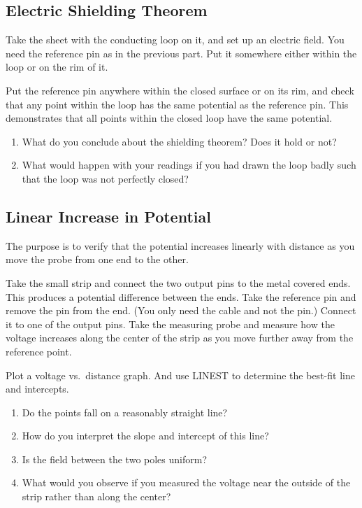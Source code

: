 \subsection{Electric Shielding Theorem}

Take the sheet with the conducting loop on it, and set up an electric field. You need the reference pin as in the previous part. Put it somewhere either within the loop or on the rim of it.\myskip

Put the reference pin anywhere within the closed surface or on its rim, and check that any point within the loop has the same potential as the reference pin. This demonstrates that all points within the closed loop have the same potential.
\begin{enumerate}
    \item What do you conclude about the shielding theorem? Does it hold or not?
    \item What would happen with your readings if you had drawn the loop badly such that the loop was not perfectly closed?
\end{enumerate}

\subsection{Linear Increase in Potential}

The purpose is to verify that the potential increases linearly with distance as you move the probe from one end to the other.\myskip

Take the small strip and connect the two output pins to the metal covered ends. This produces a potential difference between the ends. Take the reference pin and remove the pin from the end. (You only need the cable and not the pin.) Connect it to one of the output pins. Take the measuring probe and measure how the voltage increases along the center of the strip as you move further away from the reference point.\myskip

Plot a voltage vs.\ distance graph. And use LINEST to determine the best-fit line and intercepts.
\begin{enumerate}
    \item Do the points fall on a reasonably straight line?
    \item How do you interpret the slope and intercept of this line?
    \item Is the field between the two poles uniform?
    \item What would you observe if you measured the voltage near the outside of the strip rather than along the center?
\end{enumerate}


